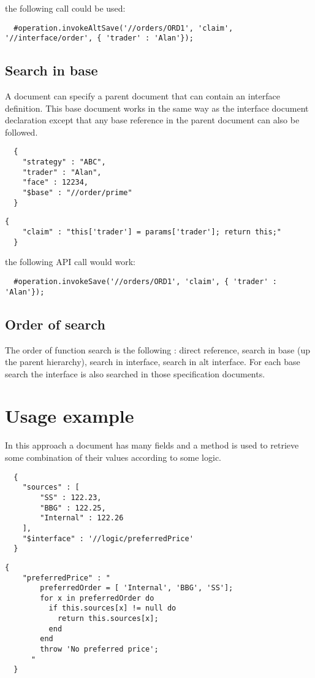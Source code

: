 the following call could be used:

\begin{lstlisting}
  #operation.invokeAltSave('//orders/ORD1', 'claim', '//interface/order', { 'trader' : 'Alan'});
\end{lstlisting}

\subsection{Search in base}
A \Rapture document can specify a parent document that can contain an interface definition. This base document works in the same
way as the interface document declaration except that any base reference in the parent document can also be followed.

\begin{lstlisting}
  {
    "strategy" : "ABC",
    "trader" : "Alan",
    "face" : 12234,
    "$base" : "//order/prime"
  }
\end{lstlisting}

\begin{lstlisting}[caption={//order/prime}]
  {
    "claim" : "this['trader'] = params['trader']; return this;"
  }
\end{lstlisting}

the following API call would work:

\begin{lstlisting}
  #operation.invokeSave('//orders/ORD1', 'claim', { 'trader' : 'Alan'});
\end{lstlisting}

\subsection{Order of search}
The order of function search is the following : direct reference, search in base (up the parent hierarchy), search in interface, search in alt interface. For each base search the interface
is also searched in those specification documents.

\section{Usage example}
In this approach a document has many fields and a method is used to retrieve some combination of their values according to some logic.
\begin{lstlisting}
  {
    "sources" : [
        "SS" : 122.23,
        "BBG" : 122.25,
        "Internal" : 122.26
    ],
    "$interface" : '//logic/preferredPrice'
  }
\end{lstlisting}
\begin{lstlisting}[caption={//logic/preferredPrice}]
  {
    "preferredPrice" : "
        preferredOrder = [ 'Internal', 'BBG', 'SS'];
        for x in preferredOrder do
          if this.sources[x] != null do
            return this.sources[x];
          end
        end
        throw 'No preferred price';
      "
  }
\end{lstlisting}

